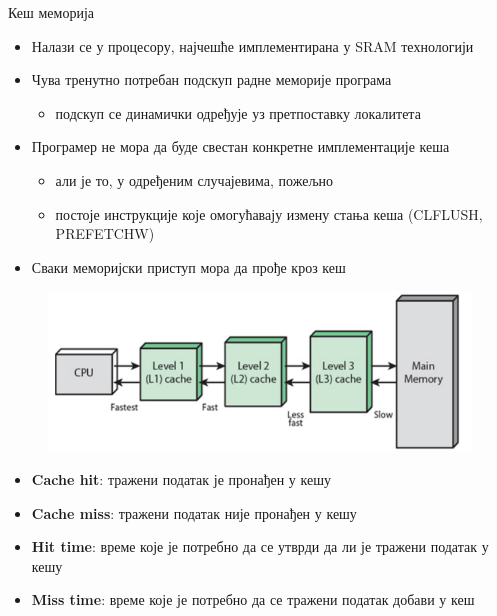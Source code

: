 \documentclass{beamer}
\begin{document}
    \begin{frame}[allowframebreaks]{Кеш меморија}
        \begin{itemize}
            \item Налази се у процесору, најчешће имплементирана у SRAM технологији
            \item Чува тренутно потребан подскуп радне меморије програма
            \begin{itemize}
                \item подскуп се динамички одређује уз претпоставку локалитета
            \end{itemize}
            \item Програмер не мора да буде свестан конкретне имплементације кеша
            \begin{itemize}
                \item али је то, у одређеним случајевима, пожељно
                \item постоје инструкције које омогућавају измену стања кеша (CLFLUSH, PREFETCHW)
            \end{itemize}
            \item Сваки меморијски приступ мора да прође кроз кеш
        \end{itemize}
        
        \framebreak

        \begin{figure}
            \centering
            \includegraphics[width=\textwidth,height=\textheight,keepaspectratio]{images/mem2.jpg}
            \label{fig:mem2}
        \end{figure}
        
        \framebreak
        
        \begin{itemize}
            \item \textbf{Cache hit}: тражени податак је пронађен у кешу
            \item \textbf{Cache miss}: тражени податак није пронађен у кешу
            \item \textbf{Hit time}: време које је потребно да се утврди да ли је тражени податак у кешу
            \item \textbf{Miss time}: време које је потребно да се тражени податак добави у кеш
        \end{itemize}
    \end{frame}
    
\end{document}
